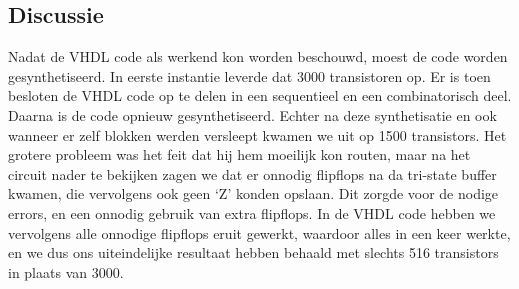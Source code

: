 \documentclass{scrartcl} %
\begin{document}
\subsection{Discussie}
Nadat de VHDL code als werkend kon worden beschouwd, moest de code worden gesynthetiseerd. In eerste instantie leverde dat 3000 transistoren op. Er is toen besloten de VHDL code op te delen in een sequentieel en een combinatorisch deel. Daarna is de code opnieuw gesynthetiseerd.  Echter na deze synthetisatie en ook wanneer er zelf blokken werden versleept kwamen we uit op 1500 transistors. Het grotere probleem was het feit dat hij hem moeilijk kon routen, maar na het circuit nader te bekijken zagen we dat er onnodig flipflops na da tri-state buffer kwamen, die vervolgens ook geen ‘Z’ konden opslaan. Dit zorgde voor de nodige errors, en een onnodig gebruik van extra flipflops. In de VHDL code hebben we vervolgens alle onnodige flipflops eruit gewerkt, waardoor alles in een keer werkte, en we dus ons uiteindelijke resultaat hebben behaald met slechts 516 transistors in plaats van 3000. 
\end{document}
